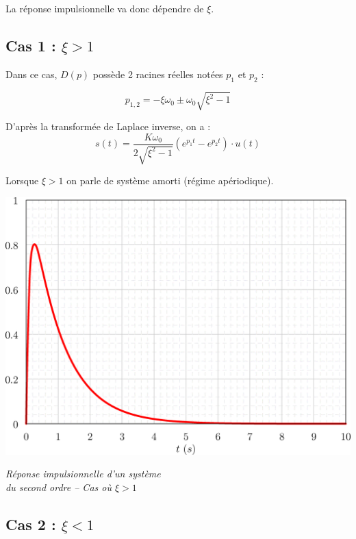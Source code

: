 \documentclass[10pt]{article}
\begin{document}
La réponse impulsionnelle va donc dépendre de $\xi$.

\subsection{Cas 1 : $\xi>1$}
\begin{minipage}[c]{.46\linewidth}
Dans ce cas, $D(p)$ possède 2 racines réelles notées $p_1$ et $p_2$ :

$$
p_{1,2} 
=-\xi\omega_0\pm\omega_0\sqrt{ \xi^2 -1}
$$


D'après la transformée de Laplace inverse, on a : 
$$
s(t)=\dfrac{K\omega_0}{2\sqrt{\xi^2-1}} \left(e^{p_1 t}-e^{p_2 t} \right)\cdot
u(t) 
$$

Lorsque $\xi>1$ on parle de système amorti (régime apériodique).
\end{minipage} \hfill
\begin{minipage}[c]{.46\linewidth}
\begin{center}
\includegraphics[width=.9\textwidth]{png/ordre2_dirac_1}

\textit{Réponse impulsionnelle d'un système \\ du second ordre -- Cas où $\xi > 1$}
\end{center}
\end{minipage}

\subsection{Cas 2 : $\xi<1$}
\end{document}
